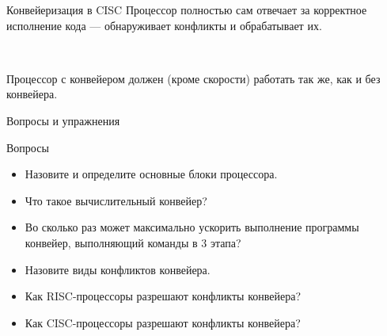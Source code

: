 \documentclass[xetex,aspectratio=43]{beamer}
\begin{document}
\begin{frame}{Конвейеризация в CISC}
    Процессор полностью сам отвечает за корректное исполнение кода --- обнаруживает конфликты и обрабатывает их.

    ~

    Процессор с конвейером должен (кроме скорости) работать так же, как и без конвейера.
\end{frame}

\begin{frame}{Вопросы и упражнения}
\begin{block}{Вопросы}
\begin{itemize}
\tightlist
\item Назовите и определите основные блоки процессора.
\item Что такое вычислительный конвейер?
\item Во сколько раз может максимально ускорить выполнение программы конвейер, выполняющий команды в 3 этапа?
\item Назовите виды конфликтов конвейера.
\item Как RISC-процессоры разрешают конфликты конвейера?
\item Как CISC-процессоры разрешают конфликты конвейера?
\end{itemize}
\end{block}
\end{frame}

\postamble
\end{document}
